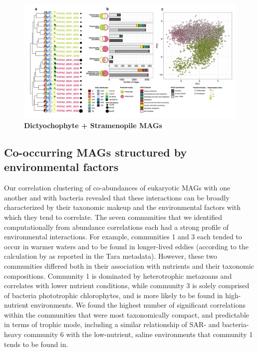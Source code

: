 \documentclass[12pt]{article}
\numberwithin{equation}{section}
\begin{document}
\begin{figure}[h!]    
    \centering
    \includegraphics[width = \columnwidth]{figures/Figure5-dendro-dictyo-panels-01.png}
    \caption{ \textbf{Dictyochophyte + Stramenopile MAGs} }
    \label{fig:fig5-dicty}
\end{figure}


\subsection*{Co-occurring MAGs structured by environmental factors } %
Our correlation clustering of co-abundances of eukaryotic MAGs with one another and with bacteria revealed that these interactions can be broadly characterized by their taxonomic makeup and the environmental factors with which they tend to correlate. The seven communities that we identified computationally from abundance correlations each had a strong profile of environmental interactions. For example, communities 1 and 3 each tended to occur in warmer waters and to be found in longer-lived eddies (according to the calculation by \cite{d2010fluid} as reported in the Tara metadata). However, these two communities differed both in their association with nutrients and their taxonomic compositions. Community 1 is dominated by heterotrophic metazoans and correlates with lower nutrient conditions, while community 3 is solely comprised of bacteria phototrophic chlorophytes, and is more likely to be found in high-nutrient environments. We found the highest number of significant correlations within the communities that were most taxonomically compact, and predictable in terms of trophic mode, including a similar relationship of SAR- and bacteria-heavy community 6 with the low-nutrient, saline environments that community 1 tends to be found in. 
\end{document}
